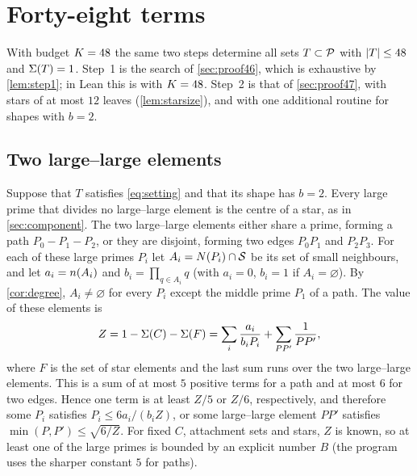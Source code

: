 \documentclass[11pt]{article}
\begin{document}
\section{Forty-eight terms}\label{sec:proof48}

With budget $K=48$ the same two steps determine all sets $T\subset\mathcal{P}$ with $\lvert T\rvert\le48$ and $\Sigma(T)=1$.
Step~1 is the search of \cref{sec:proof46}, which is exhaustive by \cref{lem:step1}; in Lean this is  with $K=48$.
Step~2 is that of \cref{sec:proof47}, with stars of at most $12$ leaves (\cref{lem:starsize}), and with one additional routine for shapes with $b=2$.

\subsection{Two large--large elements}\label{sec:twobb}

Suppose that $T$ satisfies \eqref{eq:setting} and that its shape has $b=2$.
Every large prime that divides no large--large element is the centre of a star, as in \cref{sec:component}.
The two large--large elements either share a prime, forming a path $P_0-P_1-P_2$, or they are disjoint, forming two edges $P_0P_1$ and $P_2P_3$.
For each of these large primes $P_i$ let $A_i=N(P_i)\cap\mathcal{S}$ be its set of small neighbours, and let $a_i=n(A_i)$ and $b_i=\prod_{q\in A_i}q$ (with $a_i=0$, $b_i=1$ if $A_i=\varnothing$).
By \cref{cor:degree}, $A_i\ne\varnothing$ for every $P_i$ except the middle prime $P_1$ of a path.
The value of these elements is
\[
Z=1-\Sigma(C)-\Sigma(F)=\sum_i\frac{a_i}{b_iP_i}+\sum_{PP'}\frac1{PP'},
\]
where $F$ is the set of star elements and the last sum runs over the two large--large elements.
This is a sum of at most $5$ positive terms for a path and at most $6$ for two edges.
Hence one term is at least $Z/5$ or $Z/6$, respectively, and therefore some $P_i$ satisfies $P_i\le 6a_i/(b_iZ)$, or some large--large element $PP'$ satisfies $\min(P,P')\le\sqrt{6/Z}$.
For fixed $C$, attachment sets and stars, $Z$ is known, so at least one of the large primes is bounded by an explicit number $B$ (the program uses the sharper constant $5$ for paths).
\end{document}

